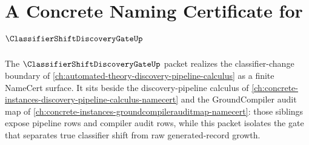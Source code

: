 \chapter{A Concrete Naming Certificate for $\ClassifierShiftDiscoveryGateUp$}
\label{ch:concrete-instances-classifier-shift-discovery-gate-namecert}

The $\ClassifierShiftDiscoveryGateUp$ packet realizes the classifier-change boundary of \autoref{ch:automated-theory-discovery-pipeline-calculus} as a finite NameCert surface. It sits beside the discovery-pipeline calculus of \autoref{ch:concrete-instances-discovery-pipeline-calculus-namecert} and the GroundCompiler audit map of \autoref{ch:concrete-instances-groundcompilerauditmap-namecert}: those siblings expose pipeline rows and compiler audit rows, while this packet isolates the gate that separates true classifier shift from raw generated-record growth.


